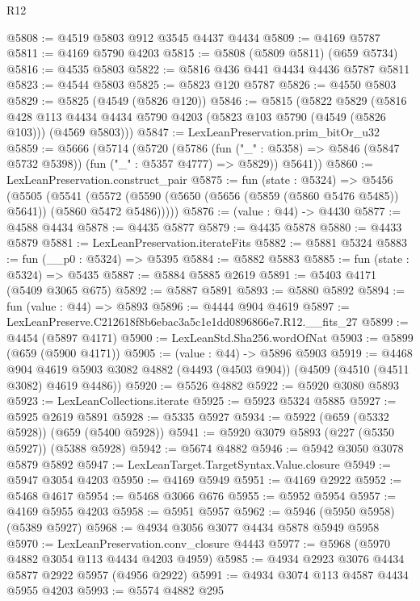 \begin{lexlean}{R12}
\begin{coremodule}
@5808 := @4519 @5803 @912 @3545 @4437 @4434
@5809 := @4169 @5787
@5811 := @4169 @5790 @4203
@5815 := @5808 (@5809 @5811) (@659 @5734)
@5816 := @4535 @5803
@5822 := @5816 @436 @441 @4434 @4436 @5787 @5811
@5823 := @4544 @5803
@5825 := @5823 @120 @5787
@5826 := @4550 @5803
@5829 := @5825 (@4549 (@5826 @120))
@5846 := @5815
    (@5822
      @5829
      (@5816
        @428
        @113
        @4434
        @4434
        @5790
        @4203
        (@5823 @103 @5790 (@4549 (@5826 @103)))
        (@4569 @5803)))
@5847 := LexLeanPreservation.prim_bitOr_u32
@5859 := @5666
    (@5714
      (@5720
        (@5786 (fun ("_" : @5358) => @5846 (@5847 @5732 @5398)) (fun ("_" : @5357 @4777) => @5829))
        @5641))
@5860 := LexLeanPreservation.construct_pair
@5875 := fun (state : @5324) =>
  @5456
    (@5505
      (@5541 (@5572 (@5590 (@5650 (@5656 (@5859 (@5860 @5476 @5485)) @5641)) (@5860 @5472 @5486)))))
@5876 := (value : @44) -> @4430
@5877 := @4588 @4434
@5878 := @4435 @5877
@5879 := @4435 @5878
@5880 := @4433 @5879
@5881 := LexLeanPreservation.iterateFits
@5882 := @5881 @5324
@5883 := fun (__p0 : @5324) => @5395
@5884 := @5882 @5883
@5885 := fun (state : @5324) => @5435
@5887 := @5884 @5885 @2619
@5891 := @5403 @4171 (@5409 @3065 @675)
@5892 := @5887 @5891
@5893 := @5880 @5892
@5894 := fun (value : @44) => @5893
@5896 := @4444 @904 @4619
@5897 := LexLeanPreserve.C212618f8b6ebac3a5c1e1dd0896866e7.R12.__fits_27
@5899 := @4454 (@5897 @4171)
@5900 := LexLeanStd.Sha256.wordOfNat
@5903 := @5899 (@659 (@5900 @4171))
@5905 := (value : @44) -> @5896 @5903
@5919 := @4468
    @904
    @4619
    @5903
    @3082
    @4882
    (@4493 (@4503 @904))
    (@4509 (@4510 (@4511 @3082) @4619 @4486))
@5920 := @5526 @4882
@5922 := @5920 @3080 @5893
@5923 := LexLeanCollections.iterate
@5925 := @5923 @5324 @5885
@5927 := @5925 @2619 @5891
@5928 := @5335 @5927
@5934 := @5922 (@659 (@5332 @5928)) (@659 (@5400 @5928))
@5941 := @5920 @3079 @5893 (@227 (@5350 @5927)) (@5388 @5928)
@5942 := @5674 @4882
@5946 := @5942 @3050 @3078 @5879 @5892
@5947 := LexLeanTarget.TargetSyntax.Value.closure
@5949 := @5947 @3054 @4203
@5950 := @4169 @5949
@5951 := @4169 @2922
@5952 := @5468 @4617
@5954 := @5468 @3066 @676
@5955 := @5952 @5954
@5957 := @4169 @5955 @4203
@5958 := @5951 @5957
@5962 := @5946 (@5950 @5958) (@5389 @5927)
@5968 := @4934 @3056 @3077 @4434 @5878 @5949 @5958
@5970 := LexLeanPreservation.conv_closure @4443
@5977 := @5968 (@5970 @4882 @3054 @113 @4434 @4203 @4959)
@5985 := @4934 @2923 @3076 @4434 @5877 @2922 @5957 (@4956 @2922)
@5991 := @4934 @3074 @113 @4587 @4434 @5955 @4203
@5993 := @5574 @4882 @295

\end{coremodule}
\end{lexlean}
